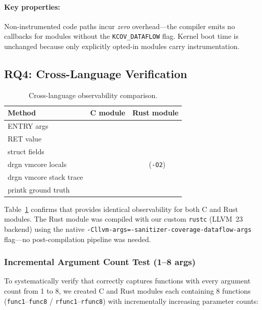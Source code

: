 \documentclass{ndss}
\newcommand{\cmark}{\ding{51}}
\newcommand{\xmark}{\ding{55}}
\begin{document}
\paragraph{Key properties:}
Non-instrumented code paths incur \emph{zero} overhead---the compiler emits no
callbacks for modules without the \texttt{KCOV\_DATAFLOW} flag. Kernel boot
time is unchanged because only explicitly opted-in modules carry
instrumentation.

\subsection{RQ4: Cross-Language Verification}\label{sec:rq4}

\begin{table}[t]
\centering
\caption{Cross-language observability comparison.}\label{tab:crosslang}
\small
\begin{tabular}{@{}lcc@{}}
\toprule
\textbf{Method} & \textbf{C module} & \textbf{Rust module} \\
\midrule
\toolname{} ENTRY args & \cmark & \cmark \\
\toolname{} RET value & \cmark & \cmark \\
\toolname{} struct fields & \cmark & \cmark \\
drgn vmcore locals & \cmark & \xmark~(\texttt{-O2}) \\
drgn vmcore stack trace & \cmark & \cmark \\
printk ground truth & \cmark & \cmark \\
\bottomrule
\end{tabular}
\end{table}

Table~\ref{tab:crosslang} confirms that \toolname{} provides identical
observability for both C and Rust modules. The Rust module was compiled with
our custom \texttt{rustc} (LLVM~23 backend) using the native
\texttt{-Cllvm-args=-sanitizer-coverage-dataflow-args} flag---no
post-compilation pipeline was needed.

\subsubsection{Incremental Argument Count Test (1--8 args)}

To systematically verify that \toolname{} correctly captures functions with
every argument count from 1 to 8, we created C and Rust modules each containing
8 functions (\texttt{func1}--\texttt{func8} / \texttt{rfunc1}--\texttt{rfunc8})
with incrementally increasing parameter counts:
\end{document}
